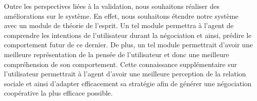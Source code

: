 \documentclass [french]{sig-alternate-05-2015}
\begin{document}
\par Outre les perspectives liées à la validation, nous souhaitons réaliser des améliorations sur le système. En effet, nous souhaitons étendre notre système avec un module de théorie de l'esprit. Un tel module permettra à l'agent de comprendre les intentions de l'utilisateur durant la négociation et ainsi, prédire le comportement futur de ce dernier.  De plus, un tel module permettrait d'avoir une meilleure  représentation de la pensée de l'utilisateur et donc une meilleure compréhension de son comportement. Cette connaissance supplémentaire sur l'utilisateur permettrait à l'agent d'avoir une meilleure perception de la relation sociale et ainsi d'adapter efficacement sa stratégie afin de générer une négociation coopérative la plus efficace possible.
\vskip 4pt


\end{document}
